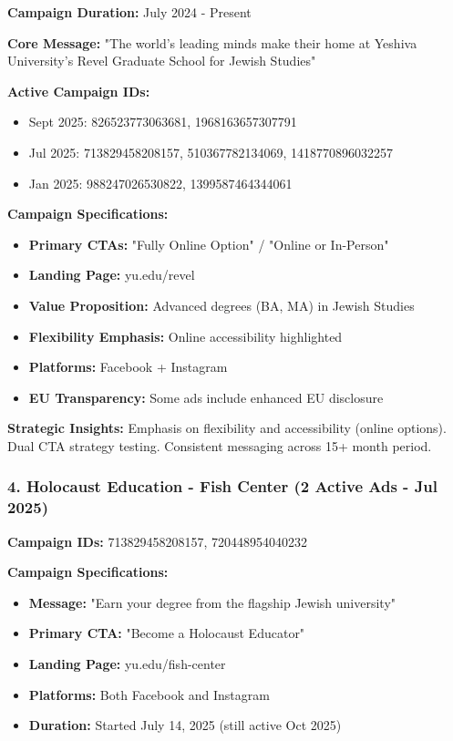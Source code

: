 \documentclass[12pt,letterpaper]{article}
\begin{document}
\textbf{Campaign Duration:} July 2024 - Present

\textbf{Core Message:} "The world's leading minds make their home at Yeshiva University's Revel Graduate School for Jewish Studies"

\textbf{Active Campaign IDs:}
\begin{itemize}[leftmargin=*]
    \item Sept 2025: 826523773063681, 1968163657307791
    \item Jul 2025: 713829458208157, 510367782134069, 1418770896032257
    \item Jan 2025: 988247026530822, 1399587464344061
\end{itemize}

\textbf{Campaign Specifications:}
\begin{itemize}[leftmargin=*]
    \item \textbf{Primary CTAs:} "Fully Online Option" / "Online or In-Person"
    \item \textbf{Landing Page:} yu.edu/revel
    \item \textbf{Value Proposition:} Advanced degrees (BA, MA) in Jewish Studies
    \item \textbf{Flexibility Emphasis:} Online accessibility highlighted
    \item \textbf{Platforms:} Facebook + Instagram
    \item \textbf{EU Transparency:} Some ads include enhanced EU disclosure
\end{itemize}

\textbf{Strategic Insights:} Emphasis on flexibility and accessibility (online options). Dual CTA strategy testing. Consistent messaging across 15+ month period.

\subsubsection{4. Holocaust Education - Fish Center (2 Active Ads - Jul 2025)}

\textbf{Campaign IDs:} 713829458208157, 720448954040232

\textbf{Campaign Specifications:}
\begin{itemize}[leftmargin=*]
    \item \textbf{Message:} "Earn your degree from the flagship Jewish university"
    \item \textbf{Primary CTA:} "Become a Holocaust Educator"
    \item \textbf{Landing Page:} yu.edu/fish-center
    \item \textbf{Platforms:} Both Facebook and Instagram
    \item \textbf{Duration:} Started July 14, 2025 (still active Oct 2025)
\end{itemize}
\end{document}

